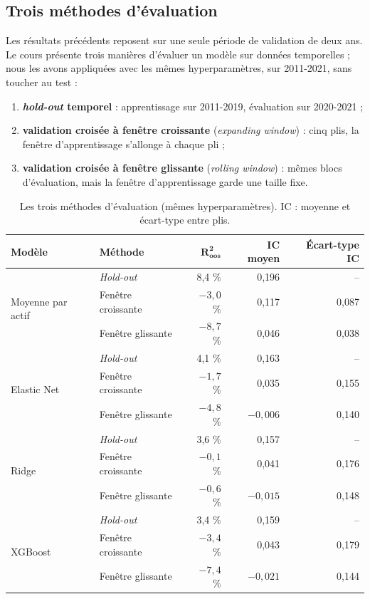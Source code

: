 \subsection{Trois méthodes d'évaluation}

Les résultats précédents reposent sur une seule période de validation de deux ans. Le cours présente trois manières d'évaluer un modèle sur données temporelles ; nous les avons appliquées avec les mêmes hyperparamètres, sur 2011-2021, sans toucher au test :
\begin{enumerate}
  \item \textbf{\emph{hold-out} temporel} : apprentissage sur 2011-2019, évaluation sur 2020-2021 ;
  \item \textbf{validation croisée à fenêtre croissante} (\emph{expanding window}) : cinq plis, la fenêtre d'apprentissage s'allonge à chaque pli ;
  \item \textbf{validation croisée à fenêtre glissante} (\emph{rolling window}) : mêmes blocs d'évaluation, mais la fenêtre d'apprentissage garde une taille fixe.
\end{enumerate}

\begin{table}[!htb]
  \centering
  \small
  \caption{Les trois méthodes d'évaluation (mêmes hyperparamètres). IC : moyenne et écart-type entre plis.}
  \label{tab:trois_eval}
  \begin{tabular}{@{}l l r r r@{}}
    \toprule
    \textbf{Modèle} & \textbf{Méthode} & $\boldsymbol{R^2_{oos}}$ & \textbf{IC moyen} & \textbf{Écart-type IC} \\
    \midrule
    \multirow{3}{*}{Moyenne par actif} & \emph{Hold-out} & 8,4 \% & 0,196 & -- \\
     & Fenêtre croissante & $-3{,}0$ \% & 0,117 & 0,087 \\
     & Fenêtre glissante & $-8{,}7$ \% & 0,046 & 0,038 \\
    \midrule
    \multirow{3}{*}{Elastic Net} & \emph{Hold-out} & 4,1 \% & 0,163 & -- \\
     & Fenêtre croissante & $-1{,}7$ \% & 0,035 & 0,155 \\
     & Fenêtre glissante & $-4{,}8$ \% & $-0{,}006$ & 0,140 \\
    \midrule
    \multirow{3}{*}{Ridge} & \emph{Hold-out} & 3,6 \% & 0,157 & -- \\
     & Fenêtre croissante & $-0{,}1$ \% & 0,041 & 0,176 \\
     & Fenêtre glissante & $-0{,}6$ \% & $-0{,}015$ & 0,148 \\
    \midrule
    \multirow{3}{*}{XGBoost} & \emph{Hold-out} & 3,4 \% & 0,159 & -- \\
     & Fenêtre croissante & $-3{,}4$ \% & 0,043 & 0,179 \\
     & Fenêtre glissante & $-7{,}4$ \% & $-0{,}021$ & 0,144 \\
    \bottomrule
  \end{tabular}
\end{table}

